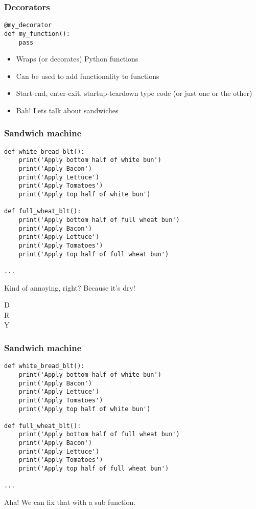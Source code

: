 \documentclass{beamer}
\begin{document}
\begin{frame}[fragile]
  \frametitle{Decorators}
\begin{verbatim}
@my_decorator
def my_function():
    pass
\end{verbatim}

\begin{exampleblock}{}
  \begin{itemize}
  \item Wraps (or decorates) Python functions
  \item Can be used to add functionality to functions
  \item Start-end, enter-exit, startup-teardown type code (or just one or the other)
  \item Bah! Lets talk about sandwiches
  \end{itemize}
\end{exampleblock}
\end{frame}


\begin{frame}[fragile]
  \frametitle{Sandwich machine}
\begin{verbatim}
def white_bread_blt():
    print('Apply bottom half of white bun')
    print('Apply Bacon')
    print('Apply Lettuce')
    print('Apply Tomatoes')
    print('Apply top half of white bun')

def full_wheat_blt():
    print('Apply bottom half of full wheat bun')
    print('Apply Bacon')
    print('Apply Lettuce')
    print('Apply Tomatoes')
    print('Apply top half of full wheat bun')

...
\end{verbatim}
\pause
Kind of annoying, right? \pause Because it's dry!
\end{frame}

\begin{frame}
  \Huge{}
  {\color{blue}D}\\
  {\color{blue}R}\\
  {\color{blue}Y}\\
  \normalsize{}
\end{frame}

\begin{frame}[fragile]
  \frametitle{Sandwich machine}
\begin{verbatim}
def white_bread_blt():
    print('Apply bottom half of white bun')
    print('Apply Bacon')
    print('Apply Lettuce')
    print('Apply Tomatoes')
    print('Apply top half of white bun')

def full_wheat_blt():
    print('Apply bottom half of full wheat bun')
    print('Apply Bacon')
    print('Apply Lettuce')
    print('Apply Tomatoes')
    print('Apply top half of full wheat bun')

...
\end{verbatim}
\pause Aha! We can fix that with a sub function.
\end{frame}
\end{document}
